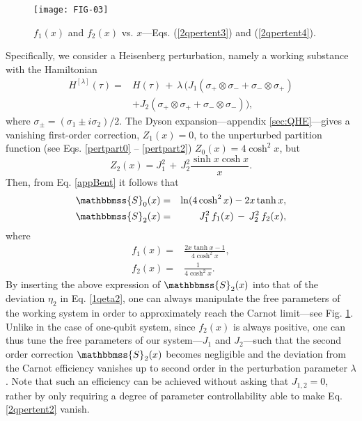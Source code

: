 \documentclass[aps,pra,floatfix,twocolumn,groupedaddress,superscriptaddress,nofootinbib,notitlepage,amsmath,amssymb,]{revtex4-1}
\begin{document}
\begin{figure}[tp] 
 \texttt{[image: FIG-03]} 
 \caption{$f_1(x)$ and $f_2(x)$ vs. $x$---Eqs. (\ref{2qpertent3}) and (\ref{2qpertent4}).} 
 \label{FIG2} 
\end{figure}  
Specifically, we consider a Heisenberg perturbation, namely a working substance with the Hamiltonian
\begin{align}
\nonumber
H^{[\lambda]}(\tau)=&H(\tau)\,+\, \lambda\, \Big(J_{1}(\sigma_{+}\otimes\sigma_{-}+\sigma_{-}\otimes\sigma_{+})\\
\label{2qpertham}
&+ J_{2}(\sigma_{+}\otimes\sigma_{+}+\sigma_{-}\otimes\sigma_{-})\Big) ,
\end{align}
where $\sigma_\pm=(\sigma_1\pm i\sigma_2)/2$. The Dyson expansion---appendix \ref{sec:QHE}---gives a vanishing first-order correction, $Z_1(x)=0$,
to the unperturbed partition function (see Eqs. \eqref{pertpart0} -- \eqref{pertpart2}) $Z_0(x)=4\cosh^2x$, but 
\begin{equation}
\label{2qpertpart}
Z_2(x)=J_{1}^{2}\,+\,J_2^2\frac{\sinh x\cosh x}{x}.
\end{equation}
Then, from Eq. \eqref{appBent} it follows that
\begin{eqnarray}
\label{2qpertent1}
\mathbbmss{S}_0(x)&=&\ln(4\cosh^2x)-2x\tanh x,\\
\label{2qpertent2}
\mathbbmss{S}_2(x)&=&J_{1}^{2}\,f_1(x)\,-\,J_{2}^{2}\,f_2(x),
\end{eqnarray}
where
\begin{align}
\label{2qpertent3}
f_1(x) =& \frac{2x\tanh x-1}{4\cosh^2x},\\
f_2(x) =& \frac{1}{4\cosh^2x}. \label{2qpertent4}
\end{align}
By inserting the above expression of $\mathbbmss{S}_2(x)$ into that of the deviation $\eta_2$ in Eq. \eqref{1qeta2}, one can always manipulate the free parameters of the working system in order to approximately reach the Carnot limit---see Fig. \ref{FIG2}. Unlike in the case of one-qubit system, since $f_2(x)$ is always positive, one can thus tune the free parameters of our system---$J_{1}$ and $J_{2}$---such that the second order correction $\mathbbmss{S}_{2}(x)$ becomes negligible and the deviation from the Carnot efficiency vanishes up to second order in the perturbation parameter $\lambda$. Note that such an efficiency can be achieved without asking that $J_{1,2}=0$, rather by only requiring a degree of parameter controllability able to make Eq. \eqref{2qpertent2} vanish.
 
\end{document}
